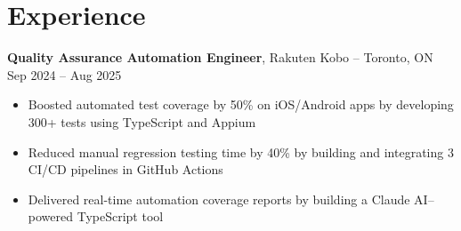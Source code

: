 

\section*{Experience}
\textbf{Quality Assurance Automation Engineer}, {Rakuten Kobo} -- Toronto, ON \hfill Sep 2024 -- Aug 2025 \\
\vspace{-5pt}
\begin{itemize}
  \item Boosted automated test coverage by 50\% on iOS/Android apps by developing 300+ tests using TypeScript and Appium
  \item Reduced manual regression testing time by 40\% by building and integrating 3 CI/CD pipelines in GitHub Actions
  \item Delivered real-time automation coverage reports by building a Claude AI–powered TypeScript tool
\end{itemize}

